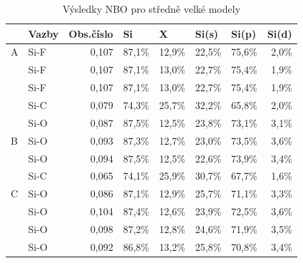 \documentclass[
  digital, %
  table,   %
  lof,     %
  lot,     %
  oneside,
]{fithesis3}
\begin{document}
\begin{table}[htbp]
\caption{Výsledky NBO pro středně velké modely}
\begin{center}
\begin{tabular}{|l|l|r|r|r|r|r|r|}
\hline
 & Vazby & \multicolumn{1}{l|}{Obs.číslo} & \multicolumn{1}{l|}{Si} & \multicolumn{1}{l|}{X} & \multicolumn{1}{l|}{Si(s)} & \multicolumn{1}{l|}{Si(p)} & \multicolumn{1}{l|}{Si(d)} \\ \hline
A  & Si-F & 0,107 & 87,1\% & 12,9\% & 22,5\% & 75,6\% & 2,0\% \\ \hline
 & Si-F & 0,107 & 87,1\% & 13,0\% & 22,7\% & 75,4\% & 1,9\% \\ \hline
 & Si-F & 0,107 & 87,1\% & 13,0\% & 22,7\% & 75,4\% & 1,9\% \\ \hline
 & Si-C & 0,079 & 74,3\% & 25,7\% & 32,2\% & 65,8\% & 2,0\% \\ \hline
 & Si-O & 0,087 & 87,5\% & 12,5\% & 23,8\% & 73,1\% & 3,1\% \\ \hline
B & Si-O & 0,093 & 87,3\% & 12,7\% & 23,0\% & 73,5\% & 3,6\% \\ \hline
 & Si-O & 0,094 & 87,5\% & 12,5\% & 22,6\% & 73,9\% & 3,4\% \\ \hline
 & Si-C & 0,065 & 74,1\% & 25,9\% & 30,7\% & 67,7\% & 1,6\% \\ \hline
C & Si-O & 0,086 & 87,1\% & 12,9\% & 25,7\% & 71,1\% & 3,3\% \\ \hline
 & Si-O & 0,104 & 87,4\% & 12,6\% & 23,9\% & 72,5\% & 3,6\% \\ \hline
 & Si-O & 0,098 & 87,2\% & 12,8\% & 24,6\% & 71,9\% & 3,5\% \\ \hline
 & Si-O & 0,092 & 86,8\% & 13,2\% & 25,8\% & 70,8\% & 3,4\% \\ \hline
\end{tabular}
\end{center}
\label{nbo_middle}
\end{table}
\end{document}
